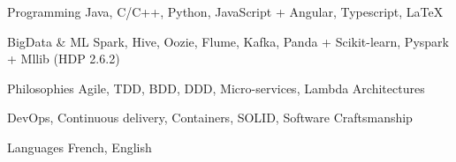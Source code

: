 


\begin{cvskills}


\cvskill
{\scriptsize Programming} %
{\scriptsize Java, C/C++, Python, JavaScript + Angular, Typescript, LaTeX} %

\cvskill
{\scriptsize BigData \& ML} %
{\scriptsize Spark, Hive, Oozie, Flume, Kafka, Panda + Scikit-learn, Pyspark + Mllib (HDP 2.6.2) } %

\cvskill
{\scriptsize Philosophies} %
{\scriptsize Agile, TDD, BDD, DDD, Micro-services, Lambda Architectures} %

\cvskill
{} %
{\scriptsize DevOps, Continuous delivery, Containers, SOLID, Software Craftsmanship} %


\cvskill
{\scriptsize Languages} %
{\scriptsize French, English} %

\end{cvskills}